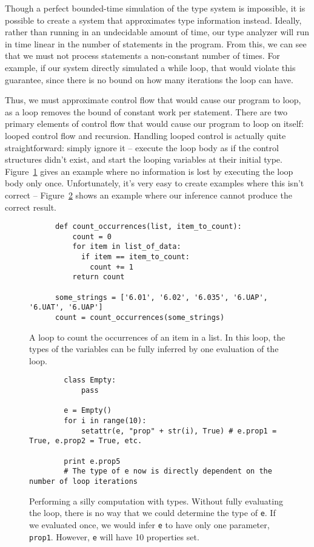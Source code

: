 \documentclass{article}[12pt]
\begin{document}
Though a perfect bounded-time simulation of the type system is impossible, it is possible to create
a system that approximates type information instead. Ideally, rather than running in an undecidable
amount of time, our type analyzer will run in time linear in the number of statements in the
program. From this, we can see that we must not process statements a non-constant number of times.
For example, if our system directly simulated a while loop, that would violate this guarantee, since
there is no bound on how many iterations the loop can have.

Thus, we must approximate control flow that would cause our program to loop, as a loop removes the
bound of constant work per statement. There are two primary elements of control flow that would
cause our program to loop on itself: looped control flow and recursion. Handling looped control is
actually quite straightforward: simply ignore it -- execute the loop body as if the 
control structures didn't exist, and start the looping variables at their initial type.
Figure~\ref{fig:ignoreloops} gives an example where no information is lost by executing the loop
body only once. Unfortunately, it's very easy to create examples where this isn't correct --
Figure~\ref{fig:cantignoreloops} shows an example where our inference cannot produce the correct
result.

\begin{figure}
    \begin{verbatim}
      def count_occurrences(list, item_to_count):
          count = 0
          for item in list_of_data:
            if item == item_to_count: 
              count += 1
          return count
      
      some_strings = ['6.01', '6.02', '6.035', '6.UAP', '6.UAT', '6.UAP']
      count = count_occurrences(some_strings)

  \end{verbatim}
  \caption{A loop to count the occurrences of an item in a list. In this loop, the types of the
      variables can be fully inferred by one evaluation of the loop.
  }
  \label{fig:ignoreloops}
\end{figure}


\begin{figure}
    \begin{verbatim}
        class Empty:
            pass

        e = Empty()
        for i in range(10):
            setattr(e, "prop" + str(i), True) # e.prop1 = True, e.prop2 = True, etc.

        print e.prop5
        # The type of e now is directly dependent on the number of loop iterations
    \end{verbatim}
    \caption{Performing a silly computation with types. Without fully evaluating the loop, there is no
        way that we could determine the type of \texttt{e}. If we evaluated once, we would infer
        \texttt{e} to have only one parameter, \texttt{prop1}. However, \texttt{e} will have 10
        properties set.  
     } 
     \label{fig:cantignoreloops}
 \end{figure}
\end{document}
